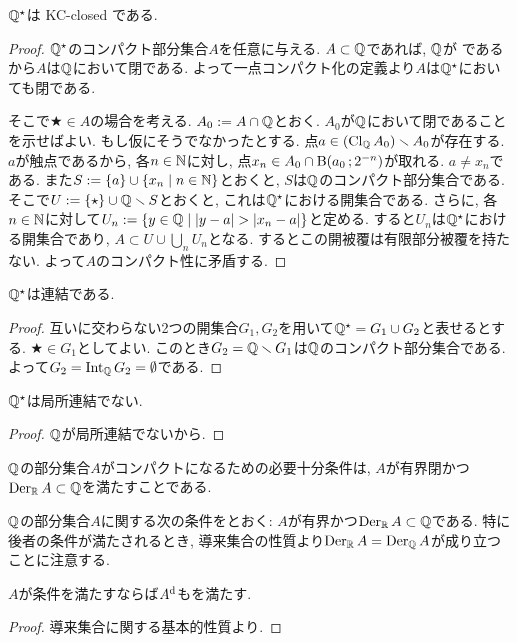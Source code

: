 \documentclass[uplatex, dvipdfmx, a4paper, 12pt, class=jsbook, crop=false]{standalone}
\begin{document}
\begin{property}
	$ \mathbb{Q}^\star $は KC-closed である.
\end{property}
\begin{proof}
	$ \mathbb{Q}^\star $のコンパクト部分集合$ A $を任意に与える. $ A \subset \mathbb{Q} $であれば, $ \mathbb{Q} $が \Hausdorff であるから$ A $は$ \mathbb{Q} $において閉である. よって一点コンパクト化の定義より$ A $は$ \mathbb{Q}^\star $においても閉である.

	そこで$ \bigstar \in A $の場合を考える. $ A_0 \mathrel{:=} A \cap \mathbb{Q} $とおく. $ A_0 $が$ \mathbb{Q} $において閉であることを示せばよい. もし仮にそうでなかったとする. 点$ a \in (\mathop{\mathrm{Cl}}\nolimits_{\mathbb{Q}} A_0) \smallsetminus A_0 $が存在する. $ a $が触点であるから, 各$ n \in \mathbb{N} $に対し, 点$ x_n \in A_0 \cap \topball{a_0}{2^{-n}} $が取れる. $ a \neq x_n  $である. また$ S \defeq \{a\} \cup \setcomp{x_n}{n \in \N} $とおくと, $ S $は$ \mathbb{Q} $のコンパクト部分集合である. そこで$ U \mathrel{:=} \{\star\} \cup \mathbb{Q} \smallsetminus S  $とおくと, これは$ \mathbb{Q}^\star $における開集合である. さらに, 各$ n \in \mathbb{N} $に対して$ U_n \defeq \setcomp{y \in \Q}{| y - a | > |x_n - a|} $と定める. すると$ U_n $は$ \mathbb{Q} ^\star $における開集合であり, $ A \subset U \cup \bigcup_n U_n $となる. するとこの開被覆は有限部分被覆を持たない. よって$ A $のコンパクト性に矛盾する.
\end{proof}

\begin{property}
	$ \mathbb{Q}^\star $は連結である.
\end{property}
\begin{proof}
	互いに交わらない2つの開集合$ G_1, G_2 $を用いて$ \mathbb{Q}^\star = G_1 \cup G_2 $と表せるとする. $ \bigstar \in G_1 $としてよい. このとき$ G_2 =\mathbb{Q} \smallsetminus G_1 $は$ \mathbb{Q} $のコンパクト部分集合である. よって$ G_2 = \mathop{\mathrm{Int}}\nolimits_{\mathbb{Q}} G_2 = \emptyset $である.
\end{proof}

\begin{property}
	$ \mathbb{Q}^\star $は局所連結でない.
\end{property}
\begin{proof}
	$ \mathbb{Q} $が局所連結でないから.
\end{proof}

\begin{property}
	$ \mathbb{Q} $の部分集合$ A $がコンパクトになるための必要十分条件は, $ A $が有界閉かつ$ \mathop{\mathrm{Der}}\nolimits_{\mathbb{R}} A \subset \mathbb{Q} $を満たすことである.
\end{property}
$ \mathbb{Q} $の部分集合$ A $に関する次の条件をとおく: $ A $が有界かつ$ \mathop{\mathrm{Der}}\nolimits_{\mathbb{R}} A \subset \mathbb{Q} $である. 特に後者の条件が満たされるとき, 導来集合の性質より$ \mathop{\mathrm{Der}}\nolimits_{\mathbb{R}} A = \mathop{\mathrm{Der}}\nolimits_{\mathbb{Q}} A $が成り立つことに注意する.
\begin{lemma}
	$ A $が条件を満たすならば$ A^{\mathrm{d}} $もを満たす.
\end{lemma}
\begin{proof}
	導来集合に関する基本的性質より.
\end{proof}
\end{document}
